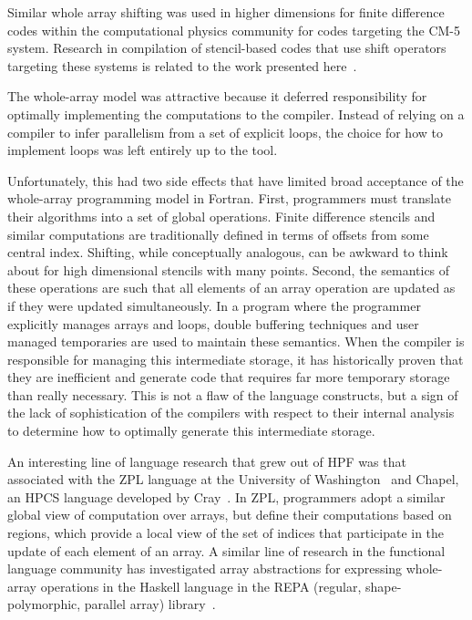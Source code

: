 \noindent
Similar whole array shifting was used in higher dimensions for finite difference
codes within the computational physics community for codes targeting the CM-5
system.  Research in compilation of stencil-based codes that use shift operators
targeting these systems is related to the work presented
here~\cite{stencil-compiler}.

The whole-array model was attractive because it deferred responsibility for
optimally implementing the computations to the compiler.  Instead of relying on
a compiler to infer parallelism from a set of explicit loops, the choice for how
to implement loops was left entirely up to the tool.

Unfortunately, this had
two side effects that have limited broad acceptance of the whole-array
programming model in Fortran.  First, programmers must translate their
algorithms into a set of global operations.  Finite difference stencils and
similar computations are traditionally defined in terms of offsets from some
central index.  Shifting, while conceptually analogous, can be awkward to think
about for high dimensional stencils with many points.  Second, the semantics of
these operations are such that all elements of an array operation are updated as
if they were updated simultaneously.  In a program where the programmer
explicitly manages arrays and loops, double buffering techniques and user
managed temporaries are used to maintain these semantics.  When the compiler is
responsible for managing this intermediate storage, it has historically proven
that they are inefficient and generate code that requires far more temporary
storage than really necessary.  This is not a flaw of the language constructs,
but a sign of the lack of sophistication of the compilers with respect to their
internal analysis to determine how to optimally generate this intermediate
storage.

An interesting line of language research that grew out of HPF was that
associated with the ZPL language at the University of
Washington~\cite{chamberlain04zpl} and Chapel, an HPCS language developed by
Cray~\cite{chamberlain_chapel}.  In ZPL, programmers adopt a similar global view
of computation over arrays, but define their computations based on regions,
which provide a local view of the set of indices that participate in the update
of each element of an array.  A similar line of research in the functional
language community has investigated array abstractions for expressing
whole-array operations in the Haskell language in the REPA (regular, shape-polymorphic,
parallel array) library~\cite{keller10repa}.

